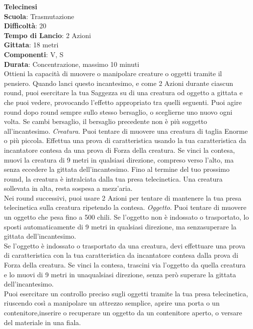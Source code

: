 \begin{multicols}{2}
\medskip\textbf{Telecinesi}\\
\textbf{Scuola}: Trasmutazione\\
\textbf{Difficoltà}:  20\\
\textbf{Tempo di Lancio}: 2 Azioni\\
\textbf{Gittata}: 18 metri\\
\textbf{Componenti}: V, S\\
\textbf{Durata}: Concentrazione, massimo 10 minuti \\
Ottieni la capacità di muovere o manipolare creature o oggetti tramite il pensiero. Quando lanci questo incantesimo, e come 2 Azioni durante ciascun round, puoi esercitare la tua Saggezza su di una creatura od oggetto a gittata e che puoi vedere, provocando l’effetto appropriato tra quelli seguenti. Puoi agire round dopo round sempre sullo stesso bersaglio, o sceglierne uno nuovo ogni volta. Se cambi bersaglio, il bersaglio precedente non è più soggetto all'incantesimo.
\textit{Creatura}. Puoi tentare di muovere una creatura di taglia Enorme o più piccola. Effettua una prova di caratteristica usando la tua caratteristica da incantatore contesa da una prova di Forza della creatura. Se vinci la contesa, muovi la creatura di 9 metri in qualsiasi direzione, compreso verso l’alto, ma senza eccedere la gittata dell'incantesimo. Fino al termine del tuo prossimo round, la creatura è intralciata dalla tua presa telecinetica. Una creatura sollevata in alta, resta sospesa a mezz’aria.\\
Nei round successivi, puoi usare 2 Azioni per tentare di mantenere la tua presa telecinetica sulla creatura ripetendo la contesa.
\textit{Oggetto}. Puoi tentare di muovere un oggetto che pesa fino a 500 chili. Se l’oggetto non è indossato o trasportato, lo sposti automaticamente di 9 metri in qualsiasi direzione, ma senzasuperare la gittata  dell'incantesimo.\\
Se l’oggetto è indossato o trasportato da una creatura, devi effettuare una prova di caratteristica con la tua caratteristica da incantatore contesa dalla prova di Forza della creatura. Se vinci la contesa, trascini via l’oggetto da quella creatura e lo muovi di 9 metri in unaqualsiasi direzione,  senza però superare la gittata dell'incantesimo.\\
Puoi esercitare un controllo preciso sugli oggetti tramite la tua presa telecinetica, riuscendo così a manipolare un attrezzo semplice, aprire una porta o un contenitore,inserire o recuperare un  oggetto da un contenitore aperto, o versare del materiale in una fiala.


\end{multicols}
